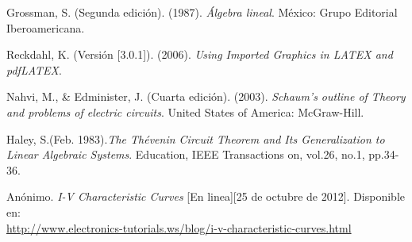 \documentclass[osajnl,showpacs,superscriptaddress,10pt]{article}
\begin{document}
\begin{thebibliography}{99}

\bibitem{} Grossman, S. (Segunda edición). (1987). \textit{Álgebra lineal}. México: Grupo Editorial Iberoamericana.

\bibitem{} Reckdahl, K. (Versión [3.0.1]). (2006).\textit{ Using Imported Graphics in LATEX and pdfLATEX}.

\bibitem{}Nahvi, M., \& Edminister, J. (Cuarta edición). (2003). \textit{Schaum's outline of Theory and problems of electric circuits}. United States of America: McGraw-Hill.

\bibitem{} Haley, S.(Feb. 1983).\textit{The Thévenin Circuit Theorem and Its Generalization to Linear Algebraic Systems}. Education, IEEE Transactions on, vol.26, no.1, pp.34-36.

\bibitem{}Anónimo.\textit{ I-V Characteristic Curves} [En linea][25 de octubre de 2012]. Disponible en:\\ \url{http://www.electronics-tutorials.ws/blog/i-v-characteristic-curves.html}
\end{thebibliography}
\end{document}
